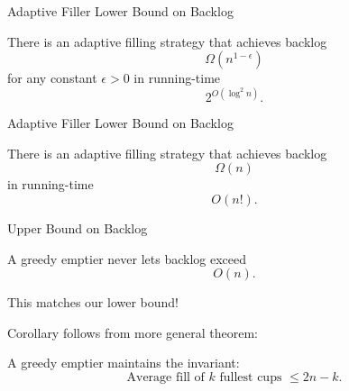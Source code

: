 \documentclass[xcolor=x11names, svgnames, rgb]{beamer}
\begin{document}
\begin{frame}[t]{Adaptive Filler Lower Bound on Backlog}
  \begin{theorem}
    There is an adaptive filling strategy that achieves
    backlog $$\Omega(n^{1-\epsilon})$$ for any constant $\epsilon >0$ in running-time $$2^{O(\log^2 n)}.$$
  \end{theorem}
\end{frame}
\begin{frame}[t]{Adaptive Filler Lower Bound on Backlog}
  \begin{theorem}
    There is an adaptive filling strategy that achieves backlog $$\Omega(n)$$ in running-time $$O(n!).$$
  \end{theorem}
\end{frame}
\begin{frame}[t]{Upper Bound on Backlog}
  \begin{corollary}
  A greedy emptier never lets backlog exceed $$O(n).$$
  \end{corollary}
  This matches our lower bound!
  \vspace{0.5cm}

  Corollary follows from more general theorem:
  \begin{theorem}
    A greedy emptier maintains the invariant: 
    $$\text{Average fill of $k$ fullest cups } \le 2n-k.$$
  \end{theorem}
\end{frame}
\end{document}
